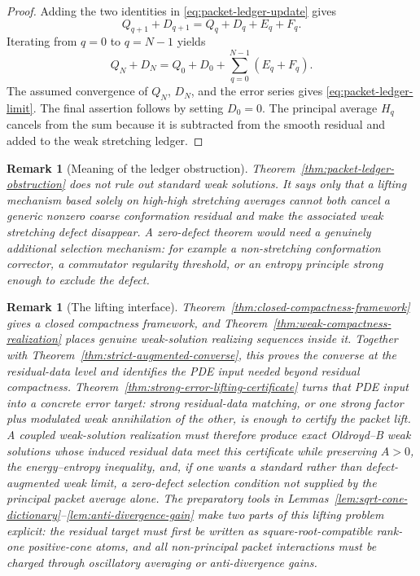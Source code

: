 \documentclass[11pt]{article}
\numberwithin{equation}{section}
\newtheorem{remark}[theorem]{Remark}
\begin{document}
\begin{proof}
Adding the two identities in \eqref{eq:packet-ledger-update} gives
\[
  Q_{q+1}+D_{q+1}
  =
  Q_q+D_q+E_q+F_q .
\]
Iterating from \(q=0\) to \(q=N-1\) yields
\[
  Q_N+D_N
  =
  Q_0+D_0+\sum_{q=0}^{N-1}(E_q+F_q).
\]
The assumed convergence of \(Q_N\), \(D_N\), and the error series gives
\eqref{eq:packet-ledger-limit}.  The final assertion follows by setting
\(D_0=0\).  The principal average \(H_q\) cancels from the sum because it is
subtracted from the smooth residual and added to the weak stretching ledger.
\end{proof}

\begin{remark}[Meaning of the ledger obstruction]
Theorem~\ref{thm:packet-ledger-obstruction} does not rule out standard weak
solutions.  It says only that a lifting mechanism based solely on high-high
stretching averages cannot both cancel a generic nonzero coarse conformation
residual and make the associated weak stretching defect disappear.  A
zero-defect theorem would need a genuinely additional selection mechanism:
for example a non-stretching conformation corrector, a commutator regularity
threshold, or an entropy principle strong enough to exclude the defect.
\end{remark}

\begin{remark}[The lifting interface]
Theorem~\ref{thm:closed-compactness-framework} gives a closed compactness
framework, and Theorem~\ref{thm:weak-compactness-realization} places genuine
weak-solution realizing sequences inside it.  Together with
Theorem~\ref{thm:strict-augmented-converse}, this proves the converse at the
residual-data level and identifies the PDE input needed beyond residual
compactness.  Theorem~\ref{thm:strong-error-lifting-certificate} turns that PDE
input into a concrete error target: strong residual-data matching, or one
strong factor plus modulated weak annihilation of the other, is enough to
certify the packet lift.  A coupled weak-solution realization must therefore
produce exact Oldroyd--B weak solutions whose induced residual data meet this
certificate while preserving \(A>0\), the energy--entropy inequality, and, if
one wants a standard rather than defect-augmented weak limit, a zero-defect
selection condition not supplied by the principal packet average alone.  The
preparatory tools in Lemmas~\ref{lem:sqrt-cone-dictionary}--\ref{lem:anti-divergence-gain}
make two parts of this lifting problem explicit: the residual target must first
be written as square-root-compatible rank-one positive-cone atoms, and all
non-principal packet interactions must be charged through oscillatory averaging
or anti-divergence gains.
\end{remark}
\end{document}
